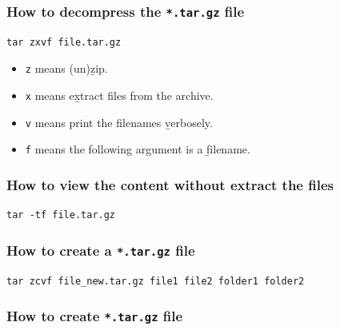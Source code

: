 \documentclass[]{book}
\providecommand{\tightlist}{%
  \setlength{\itemsep}{0pt}\setlength{\parskip}{0pt}}
\begin{document}
\hypertarget{how-to-decompress-the-.tar.gz-file}{%
\subsubsection{\texorpdfstring{How to decompress the \texttt{*.tar.gz} file}{How to decompress the *.tar.gz file}}\label{how-to-decompress-the-.tar.gz-file}}

\begin{verbatim}
tar zxvf file.tar.gz
\end{verbatim}

\begin{itemize}
\tightlist
\item
  \texttt{z} means (un)z̲ip.
\item
  \texttt{x} means ex̲tract files from the archive.
\item
  \texttt{v} means print the filenames v̲erbosely.
\item
  \texttt{f} means the following argument is a f̱ilename.
\end{itemize}

\hypertarget{how-to-view-the-content-without-extract-the-files}{%
\subsubsection{How to view the content without extract the files}\label{how-to-view-the-content-without-extract-the-files}}

\begin{verbatim}
tar -tf file.tar.gz
\end{verbatim}

\hypertarget{how-to-create-a-.tar.gz-file}{%
\subsubsection{\texorpdfstring{How to create a \texttt{*.tar.gz} file}{How to create a *.tar.gz file}}\label{how-to-create-a-.tar.gz-file}}

\begin{verbatim}
tar zcvf file_new.tar.gz file1 file2 folder1 folder2
\end{verbatim}

\hypertarget{how-to-create-.tar.gz-file}{%
\subsubsection{\texorpdfstring{How to create \texttt{*.tar.gz} file}{How to create *.tar.gz file}}\label{how-to-create-.tar.gz-file}}
\end{document}
